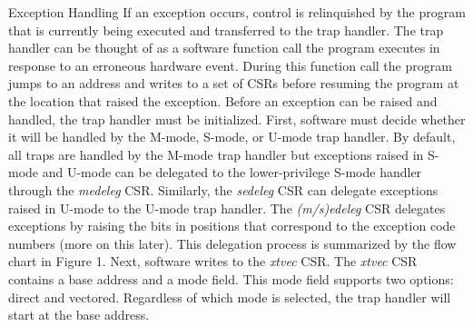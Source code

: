 \documentclass[12pt]{article}
\begin{document}
\begin{section}{Exception Handling}
If an exception occurs, control is relinquished by the program that is currently being executed and transferred to the trap handler. The trap handler can be thought of as a software function call the program executes in response to an erroneous hardware event. During this function call the program jumps to an address and writes to a set of CSRs before resuming the program at the location that raised the exception. Before an exception can be raised and handled, the trap handler must be initialized. First, software must decide whether it will be handled by the M-mode, S-mode, or U-mode trap handler. By default, all traps are handled by the M-mode trap handler but exceptions raised in S-mode and U-mode can be delegated to the lower-privilege S-mode handler through the \emph{medeleg} CSR. Similarly, the \emph{sedeleg} CSR can delegate exceptions raised in U-mode to the U-mode trap handler. The \emph{(m/s)edeleg} CSR delegates exceptions by raising the bits in positions that correspond to the exception code numbers (more on this later). This delegation process is summarized by the flow chart in Figure 1. Next, software writes to the \emph{xtvec} CSR. The \emph{xtvec} CSR contains a base address and a mode field. This mode field supports two options: direct and vectored. Regardless of which mode is selected, the trap handler will start at the base address. 


\end{section}
\end{document}
